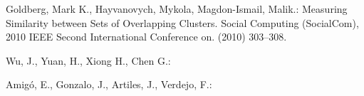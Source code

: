 \begin{scriptsize}
\begin{thebibliography}{1}
\begin{frame}
\begin{block}
 Goldberg, Mark K., Hayvanovych, Mykola, Magdon-Ismail, Malik.: Measuring Similarity between Sets of Overlapping Clusters. Social Computing (SocialCom), 2010 IEEE Second International Conference on.
(2010)  303--308.

Wu, J., Yuan, H., Xiong H., Chen G.:
 
Amigó, E., Gonzalo, J., Artiles, J., Verdejo, F.:

%
%
%  
%
\end{block}
\end{frame}
\end{thebibliography}\end{scriptsize}

